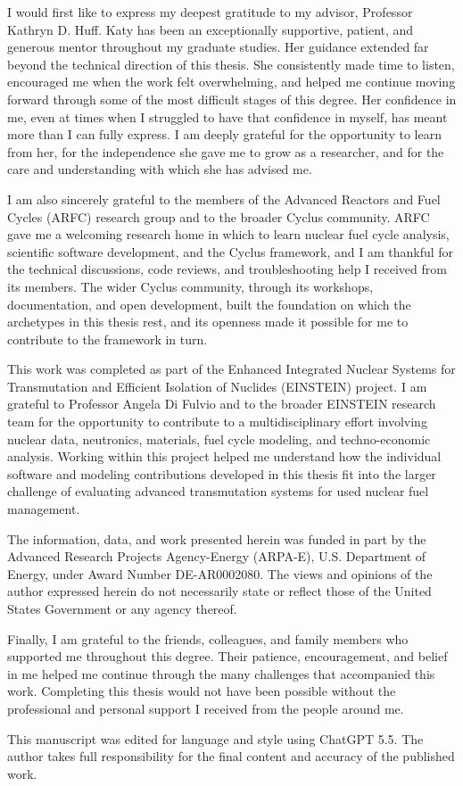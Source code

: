 \documentclass[edeposit,fullpage]{uiucthesis2021}
\begin{document}
\begin{acknowledgments}

I would first like to express my deepest gratitude to my advisor,
Professor Kathryn D. Huff. Katy has been an exceptionally supportive,
patient, and generous mentor throughout my graduate studies. Her guidance
extended far beyond the technical direction of this thesis. She consistently
made time to listen, encouraged me when the work felt overwhelming, and helped
me continue moving forward through some of the most difficult stages of this
degree. Her confidence in me, even at times when I struggled to have that
confidence in myself, has meant more than I can fully express. I am deeply
grateful for the opportunity to learn from her, for the independence she gave
me to grow as a researcher, and for the care and understanding with which she
has advised me.

I am also sincerely grateful to the members of the Advanced Reactors and Fuel
Cycles (ARFC) research group and to the broader Cyclus community. ARFC gave
me a welcoming research home in which to learn nuclear fuel cycle analysis,
scientific software development, and the Cyclus framework, and I am thankful
for the technical discussions, code reviews, and troubleshooting help I received
from its members. The wider Cyclus community, through its workshops, documentation,
and open development, built the foundation on which the archetypes in this thesis rest,
and its openness made it possible for me to contribute to the framework in turn.

This work was completed as part of the Enhanced Integrated Nuclear Systems for
Transmutation and Efficient Isolation of Nuclides (EINSTEIN) project. I am
grateful to Professor Angela Di Fulvio and to the broader EINSTEIN research
team for the opportunity to contribute to a multidisciplinary effort involving
nuclear data, neutronics, materials, fuel cycle modeling, and techno-economic
analysis. Working within this project helped me understand how the individual
software and modeling contributions developed in this thesis fit into the
larger challenge of evaluating advanced transmutation systems for used nuclear
fuel management.

The information, data, and work presented herein was funded in part
by the Advanced Research Projects Agency-Energy (ARPA-E), U.S. Department of Energy,
under Award Number DE-AR0002080. The views and opinions of the author expressed
herein do not necessarily state or reflect those of the United States Government or any
agency thereof.

Finally, I am grateful to the friends, colleagues, and family members who
supported me throughout this degree. Their patience, encouragement, and belief
in me helped me continue through the many challenges that accompanied this
work. Completing this thesis would not have been possible without the
professional and personal support I received from the people around me.

This manuscript was edited for language and style using ChatGPT 5.5.
The author takes full responsibility for the final content and accuracy of the published work.
\end{acknowledgments}
\end{document}
